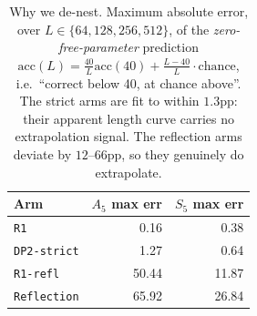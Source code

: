 \documentclass[10pt,twocolumn]{article}
\newcommand{\hd}[1]{\multicolumn{1}{c}{#1}}
\begin{document}
\begin{table}[t]
\centering
\footnotesize
\caption{Why we de-nest. Maximum absolute error, over
$L\in\{64,128,256,512\}$, of the \emph{zero-free-parameter} prediction
$\mathrm{acc}(L) = \frac{40}{L}\mathrm{acc}(40)
+ \frac{L-40}{L}\cdot\text{chance}$, i.e.\ ``correct below 40, at chance
above''. The strict arms are fit to within $1.3$pp: their apparent length curve
carries no extrapolation signal. The reflection arms deviate by $12$--$66$pp, so
they genuinely do extrapolate.}
\label{tab:dilution}
\begin{tabular}{lrr}
\toprule
Arm & \hd{$A_5$ max err} & \hd{$S_5$ max err} \\
\midrule
\texttt{R1}          & 0.16 & 0.38 \\
\texttt{DP2-strict}  & 1.27 & 0.64 \\
\texttt{R1-refl}     & 50.44 & 11.87 \\
\texttt{Reflection}  & 65.92 & 26.84 \\
\bottomrule
\end{tabular}
\end{table}
\end{document}
